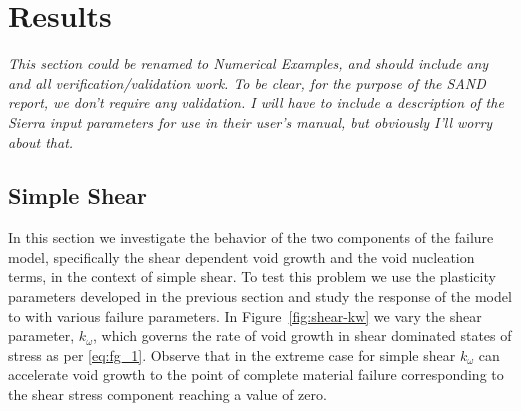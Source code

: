 \chapter{Results}
\label{results}

\textit{This section could be renamed to Numerical Examples, and
  should include any and all verification/validation work. To be
  clear, for the purpose of the SAND report, we don't require any
  validation. I will have to include a description of the Sierra input
  parameters for use in their user's manual, but obviously I'll worry
  about that.}

\section{Simple Shear}
\label{simple-shear}

In this section we investigate the behavior of the two components of
the failure model, specifically the shear dependent void growth and
the void nucleation terms, in the context of simple shear. To test
this problem we use the plasticity parameters developed in the
previous section and study the response of the model to with various
failure parameters. In Figure~\ref{fig:shear-kw} we vary the shear
parameter, $k_{\omega}$, which governs the rate of void growth in
shear dominated states of stress as per \eqref{eq:fg_1}. Observe that
in the extreme case for simple shear $k_{\omega}$ can accelerate void
growth to the point of complete material failure corresponding to the
shear stress component reaching a value of zero.

